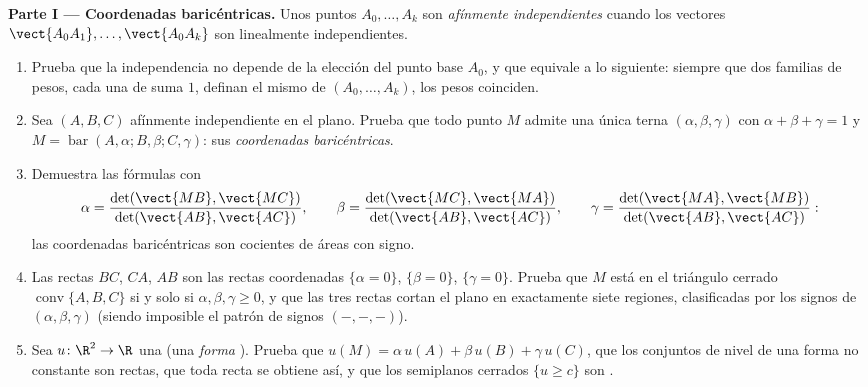 \begin{problem}
\medskip
\noindent\textbf{Parte I --- Coordenadas baricéntricas.} Unos puntos
$A_0, \dots, A_k$ son \emph{afínmente independientes} cuando los
vectores $\vect{A_0A_1}, \dots, \vect{A_0A_k}$ son linealmente
independientes.
\begin{enumerate}
  \item Prueba que la independencia  no depende de la elección
        del punto base $A_0$, y que equivale a lo siguiente: siempre
        que dos familias de pesos, cada una de suma $1$, definan el
        mismo  de $(A_0, \dots, A_k)$, los pesos
        coinciden.
  \item Sea $(A, B, C)$ afínmente independiente en el plano. Prueba
        que todo punto $M$ admite una única terna $(\alpha, \beta,
        \gamma)$ con $\alpha + \beta + \gamma = 1$ y $M =
        \operatorname{bar}(A, \alpha; B, \beta; C, \gamma)$: sus
        \emph{coordenadas baricéntricas}.
  \item Demuestra las fórmulas con 
        \[
        \alpha = \frac{\det(\vect{MB},
        \vect{MC})}{\det(\vect{AB}, \vect{AC})},
        \qquad
        \beta = \frac{\det(\vect{MC},
        \vect{MA})}{\det(\vect{AB}, \vect{AC})},
        \qquad
        \gamma = \frac{\det(\vect{MA},
        \vect{MB})}{\det(\vect{AB}, \vect{AC})} :
        \]
        las coordenadas baricéntricas son cocientes de áreas con
        signo.
  \item Las rectas $BC$, $CA$, $AB$ son las rectas coordenadas
        $\{\alpha = 0\}$, $\{\beta = 0\}$, $\{\gamma = 0\}$. Prueba
        que $M$ está en el triángulo cerrado $\operatorname{conv}\{A,
        B, C\}$ si y solo si $\alpha, \beta, \gamma \geq 0$, y que
        las tres rectas cortan el plano en exactamente siete
        regiones, clasificadas por los signos de $(\alpha, \beta,
        \gamma)$ (siendo imposible el patrón de signos $(-, -, -)$).
  \item Sea $u \colon \R^2 \to \R$ una  (una
        \emph{forma }). Prueba que $u(M) = \alpha\,u(A) +
        \beta\,u(B) + \gamma\,u(C)$, que los conjuntos de nivel de
        una forma  no constante son rectas, que toda recta se
        obtiene así, y que los semiplanos cerrados $\{u \geq c\}$ son
        .
\end{enumerate}


\end{problem}
